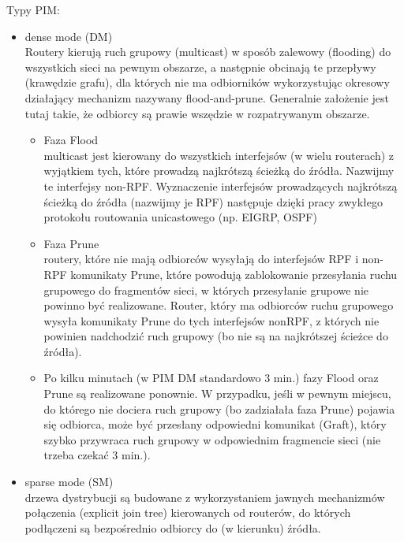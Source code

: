 \documentclass[../main.tex]{subfiles}
\begin{document}
    Typy PIM:
    \begin{itemize}
        \item dense mode (DM)\\
        Routery kierują ruch grupowy (multicast) w sposób zalewowy
        (flooding) do wszystkich sieci na pewnym obszarze, a następnie obcinają te przepływy
        (krawędzie grafu), dla których nie ma odbiorników wykorzystując okresowy działający
        mechanizm nazywany flood-and-prune. Generalnie założenie jest tutaj takie, że odbiorcy są
        prawie wszędzie w rozpatrywanym obszarze.
        \begin{itemize}
            \item Faza Flood\\
            multicast jest kierowany do wszystkich interfejsów (w wielu
            routerach) z wyjątkiem tych, które prowadzą najkrótszą ścieżką do źródła. Nazwijmy te
            interfejsy non-RPF. Wyznaczenie interfejsów prowadzących najkrótszą ścieżką do źródła
            (nazwijmy je RPF) następuje dzięki pracy zwykłego protokołu routowania unicastowego (np.
            EIGRP, OSPF)
            \item Faza Prune\\
            routery, które nie mają odbiorców wysyłają do interfejsów RPF i
            non-RPF komunikaty Prune, które powodują zablokowanie przesyłania ruchu grupowego do
            fragmentów sieci, w których przesyłanie grupowe nie powinno być realizowane. Router,
            który ma odbiorców ruchu grupowego wysyła komunikaty Prune do tych interfejsów nonRPF, z których nie powinien nadchodzić ruch grupowy (bo nie są na najkrótszej ścieżce do
            źródła).
            \item Po kilku minutach (w PIM DM standardowo 3 min.) fazy Flood oraz Prune są realizowane
            ponownie. W przypadku, jeśli w pewnym miejscu, do którego nie dociera ruch grupowy (bo
            zadziałała faza Prune) pojawia się odbiorca, może być przesłany odpowiedni komunikat
            (Graft), który szybko przywraca ruch grupowy w odpowiednim fragmencie sieci (nie trzeba
            czekać 3 min.).
        \end{itemize}

        \item sparse mode (SM)\\
        drzewa dystrybucji są budowane z wykorzystaniem jawnych
        mechanizmów połączenia (explicit join tree) kierowanych od routerów, do których
        podłączeni są bezpośrednio odbiorcy do (w kierunku) źródła.

    \end{itemize}
\end{document}
